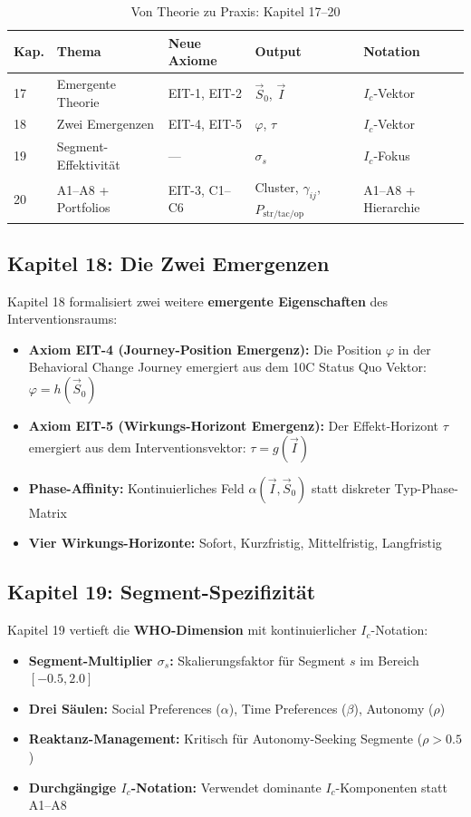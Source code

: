 \begin{table}[htbp]
\centering
\caption{Von Theorie zu Praxis: Kapitel 17--20}
\label{tab:17-chapters}
\renewcommand{\arraystretch}{1.3}
\begin{tabular}{@{}lllll@{}}
\toprule
\textbf{Kap.} & \textbf{Thema} & \textbf{Neue Axiome} & \textbf{Output} & \textbf{Notation} \\
\midrule
17 & Emergente Theorie & EIT-1, EIT-2 & $\vec{S}_0$, $\vec{I}$ & $I_c$-Vektor \\
18 & Zwei Emergenzen & EIT-4, EIT-5 & $\varphi$, $\tau$ & $I_c$-Vektor \\
19 & Segment-Effektivit\"{a}t & --- & $\sigma_s$ & $I_c$-Fokus \\
20 & A1--A8 + Portfolios & EIT-3, C1--C6 & Cluster, $\gamma_{ij}$, $P_{\text{str/tac/op}}$ & A1--A8 + Hierarchie \\
\bottomrule
\end{tabular}
\end{table}

\subsection{Kapitel 18: Die Zwei Emergenzen}
\label{sec:17-ch18}

Kapitel 18 formalisiert zwei weitere \textbf{emergente Eigenschaften} des Interventionsraums:
\begin{itemize}[nosep]
\item \textbf{Axiom EIT-4 (Journey-Position Emergenz):} Die Position $\varphi$ in der Behavioral Change Journey emergiert aus dem 10C Status Quo Vektor: $\varphi = h(\vec{S}_0)$
\item \textbf{Axiom EIT-5 (Wirkungs-Horizont Emergenz):} Der Effekt-Horizont $\tau$ emergiert aus dem Interventionsvektor: $\tau = g(\vec{I})$
\item \textbf{Phase-Affinity:} Kontinuierliches Feld $\alpha(\vec{I}, \vec{S}_0)$ statt diskreter Typ-Phase-Matrix
\item \textbf{Vier Wirkungs-Horizonte:} Sofort, Kurzfristig, Mittelfristig, Langfristig
\end{itemize}

\subsection{Kapitel 19: Segment-Spezifizit\"{a}t}
\label{sec:17-ch19}

Kapitel 19 vertieft die \textbf{WHO-Dimension} mit kontinuierlicher $I_c$-Notation:
\begin{itemize}[nosep]
\item \textbf{Segment-Multiplier $\sigma_s$:} Skalierungsfaktor f\"{u}r Segment $s$ im Bereich $[-0.5, 2.0]$
\item \textbf{Drei S\"{a}ulen:} Social Preferences ($\alpha$), Time Preferences ($\beta$), Autonomy ($\rho$)
\item \textbf{Reaktanz-Management:} Kritisch f\"{u}r Autonomy-Seeking Segmente ($\rho > 0.5$)
\item \textbf{Durchg\"{a}ngige $I_c$-Notation:} Verwendet dominante $I_c$-Komponenten statt A1--A8
\end{itemize}

